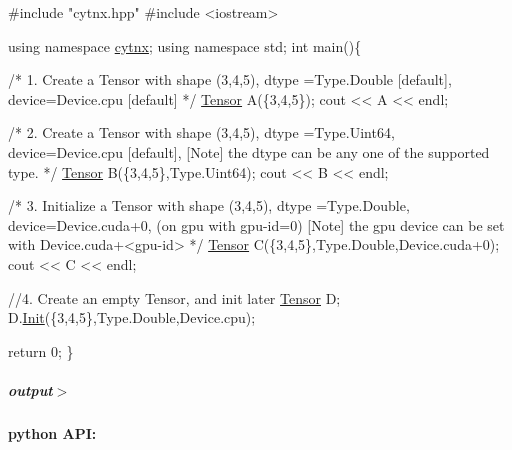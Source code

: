 \begin{DoxyCodeInclude}
\textcolor{preprocessor}{#include "cytnx.hpp"}
\textcolor{preprocessor}{#include <iostream>}


\textcolor{keyword}{using namespace }\hyperlink{namespacecytnx}{cytnx};
\textcolor{keyword}{using namespace }std;
\textcolor{keywordtype}{int} main()\{ 

    \textcolor{comment}{/*}
\textcolor{comment}{        1. Create a Tensor with }
\textcolor{comment}{        shape (3,4,5),}
\textcolor{comment}{        dtype =Type.Double [default],}
\textcolor{comment}{        device=Device.cpu [default]}
\textcolor{comment}{    */}
    \hyperlink{classcytnx_1_1Tensor}{Tensor} A(\{3,4,5\});
    cout << A << endl;

    \textcolor{comment}{/*}
\textcolor{comment}{        2. Create a Tensor with }
\textcolor{comment}{        shape (3,4,5),}
\textcolor{comment}{        dtype =Type.Uint64,}
\textcolor{comment}{        device=Device.cpu [default],}
\textcolor{comment}{        [Note] the dtype can be any one of the supported type.}
\textcolor{comment}{    */}
    \hyperlink{classcytnx_1_1Tensor}{Tensor} B(\{3,4,5\},Type.Uint64);
    cout << B << endl;

    \textcolor{comment}{/*}
\textcolor{comment}{        3. Initialize a Tensor with }
\textcolor{comment}{        shape (3,4,5),}
\textcolor{comment}{        dtype =Type.Double,}
\textcolor{comment}{        device=Device.cuda+0, (on gpu with gpu-id=0)}
\textcolor{comment}{        [Note] the gpu device can be set with Device.cuda+<gpu-id>}
\textcolor{comment}{    */}
    \hyperlink{classcytnx_1_1Tensor}{Tensor} C(\{3,4,5\},Type.Double,Device.cuda+0);
    cout << C << endl;

    \textcolor{comment}{//4. Create an empty Tensor, and init later}
    \hyperlink{classcytnx_1_1Tensor}{Tensor} D;
    D.\hyperlink{classcytnx_1_1Tensor_afdb4470e0dc934964d80aa9c761cca48}{Init}(\{3,4,5\},Type.Double,Device.cpu);

    \textcolor{keywordflow}{return} 0;
\}

\end{DoxyCodeInclude}
 \subparagraph*{output$>$}


\begin{DoxyVerbInclude}
\end{DoxyVerbInclude}
 \paragraph*{python A\+PI\+:}


